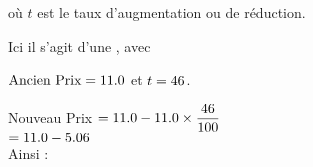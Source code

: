 \documentclass[12pt]{article}
\begin{document}
{\begin{multicols}{2}
où $t$ est le taux d'augmentation ou de réduction.

Ici il s'agit d'une \operation, avec

$\text{Ancien Prix} = \num{11.0}$ et $t = \num{\fpeval{abs(\augmentation)}}$.

\columnbreak

Nouveau Prix $= \num{\na} \sign \num{\na} \times \dfrac{\num{\fpeval{abs(\augmentation)}}}{100}$\\

\phantom{Nouveau Prix} $=\num{\na} \sign \num{\fpeval{\na * abs(\augmentation) / 100}} $\\

Ainsi  :\\
\afficherresultat

\end{multicols}
}
\end{document}
